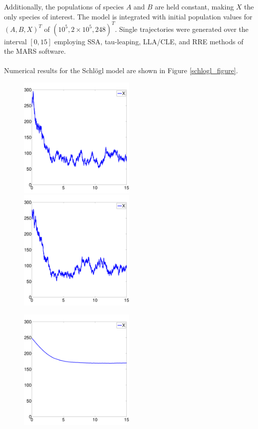 \documentclass[ugrad,lot,lof,openright,11pt,oneside,onehalfspace]{RUthesis}
\begin{document}
		\noindent
		Additionally, the populations of species $A$ and $B$ are held constant, making $X$ the only species of interest. The model is integrated with initial population values for $(A,B,X)^T$ of $(10^5,2 \times 10^5,248)^T$. Single trajectories were generated over the interval $[0,15]$ employing SSA, tau-leaping, LLA/CLE, and RRE methods of the MARS software.\\
		\\
		Numerical results for the Schl\"{o}gl model are shown in Figure \ref{schlogl_figure}.

		\begin{figure}[H]
		\centerline{
			\includegraphics[width=0.5\textwidth]{figures/Schlogl_ssa.pdf}
			\includegraphics[width=0.5\textwidth]{figures/Schlogl_tau.pdf}
			}
		\centerline{
			\includegraphics[width=0.5\textwidth]{figures/Schlogl_cle.pdf}
}
\end{figure}
\end{document}
